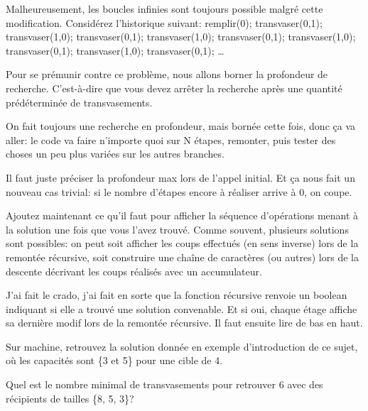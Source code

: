 \documentclass[10pt]{article}\usepackage[correction,nu]{esial}%
\begin{document}
\Question Malheureusement, les boucles infinies sont toujours possible malgré
cette modification. Considérez l'historique suivant: remplir(0);
transvaser(0,1); transvaser(1,0); transvaser(0,1); transvaser(1,0);
transvaser(0,1); transvaser(1,0); transvaser(0,1); transvaser(1,0);
transvaser(0,1); \ldots

Pour se prémunir contre ce problème, nous allons borner la profondeur de
recherche. C'est-à-dire que vous devez arrêter la recherche après une quantité
prédéterminée de transvasements.

\begin{Reponse}
  On fait toujours une recherche en profondeur, mais bornée cette fois, donc ça
  va aller: le code va faire n'importe quoi sur N étapes, remonter, puis tester
  des choses un peu plus variées sur les autres branches.

  Il faut juste préciser la profondeur max lors de l'appel initial.
  Et ça nous fait un nouveau cas trivial: si le nombre d'étapes encore à
  réaliser arrive à 0, on coupe.
\end{Reponse}

\Question Ajoutez maintenant ce qu'il faut pour afficher la séquence
d'opérations menant à la solution une fois que vous l'avez trouvé. Comme
souvent, plusieurs solutions sont possibles: on peut soit afficher les coups
effectués (en sens inverse) lors de la remontée récursive, soit construire une
chaîne de caractères (ou autres) lors de la descente décrivant les coups
réalisés avec un accumulateur.

\begin{Reponse}
  J'ai fait le crado, j'ai fait en sorte que la fonction récursive renvoie un
  boolean indiquant si elle a trouvé une solution convenable. Et si oui, chaque
  étage affiche sa dernière modif lors de la remontée récursive. Il faut ensuite
  lire de bas en haut.

  \newcommand*\FancyVerbStartString{// BEGIN SOLVE}
  \newcommand*\FancyVerbStopString{// END SOLVE}
\end{Reponse}

\Question Sur machine, retrouvez la solution donnée en exemple d'introduction de
ce sujet, où les capacités sont \{3 et 5\} pour une cible de 4.

\Question Quel est le nombre minimal de transvasements pour retrouver 6 avec des
récipients de tailles \{8, 5, 3\}?
\end{document}
